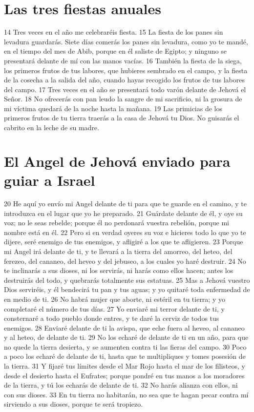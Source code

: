 \section{Las tres fiestas anuales}

14 Tres veces en el año me celebraréis fiesta.
15 La fiesta de los panes sin levadura guardarás. Siete días comerás los panes sin levadura, como yo te mandé, en el tiempo del mes de Abib, porque en él saliste de Egipto; y ninguno se presentará delante de mí con las manos vacías.
16 También la fiesta de la siega, los primeros frutos de tus labores, que hubieres sembrado en el campo, y la fiesta de la cosecha a la salida del año, cuando hayas recogido los frutos de tus labores del campo.
17 Tres veces en el año se presentará todo varón delante de Jehová el Señor.
18 No ofrecerás con pan leudo la sangre de mi sacrificio, ni la grosura de mi víctima quedará de la noche hasta la mañana.
19 Las primicias de los primeros frutos de tu tierra traerás a la casa de Jehová tu Dios. No guisarás el cabrito en la leche de su madre.

\section{El Angel de Jehová enviado para guiar a Israel}

20 He aquí yo envío mi Angel delante de ti para que te guarde en el camino, y te introduzca en el lugar que yo he preparado.
21 Guárdate delante de él, y oye su voz; no le seas rebelde; porque él no perdonará vuestra rebelión, porque mi nombre está en él.
22 Pero si en verdad oyeres su voz e hicieres todo lo que yo te dijere, seré enemigo de tus enemigos, y afligiré a los que te afligieren.
23 Porque mi Angel irá delante de ti, y te llevará a la tierra del amorreo, del heteo, del ferezeo, del cananeo, del heveo y del jebuseo, a los cuales yo haré destruir.
24 No te inclinarás a sus dioses, ni los servirás, ni harás como ellos hacen; antes los destruirás del todo, y quebrarás totalmente sus estatuas.
25 Mas a Jehová vuestro Dios serviréis, y él bendecirá tu pan y tus aguas; y yo quitaré toda enfermedad de en medio de ti.
26 No habrá mujer que aborte, ni estéril en tu tierra; y yo completaré el número de tus días.
27 Yo enviaré mi terror delante de ti, y consternaré a todo pueblo donde entres, y te daré la cerviz de todos tus enemigos.
28 Enviaré delante de ti la avispa, que eche fuera al heveo, al cananeo y al heteo, de delante de ti.
29 No los echaré de delante de ti en un año, para que no quede la tierra desierta, y se aumenten contra ti las fieras del campo.
30 Poco a poco los echaré de delante de ti, hasta que te multipliques y tomes posesión de la tierra.
31 Y fijaré tus límites desde el Mar Rojo hasta el mar de los filisteos, y desde el desierto hasta el Eufrates; porque pondré en tus manos a los moradores de la tierra, y tú los echarás de delante de ti.
32 No harás alianza con ellos, ni con sus dioses.
33 En tu tierra no habitarán, no sea que te hagan pecar contra mí sirviendo a sus dioses, porque te será tropiezo.

